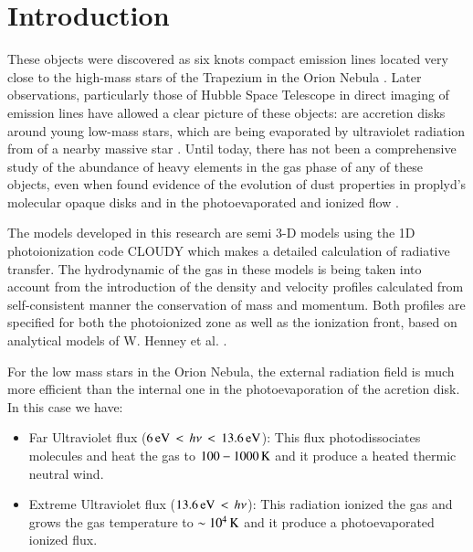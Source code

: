 \documentclass[aaspp]{article}
\begin{document}


\section{Introduction}
\label{sec:introduction}

These objects were discovered as six knots compact emission lines located very close to the high-mass stars of the Trapezium in the Orion Nebula \citep{1979AA.7397L}. Later observations, particularly those of Hubble Space Telescope in direct imaging of emission lines \citep{1993ApJ410..696O, 1998AJ.115..263O, 1998AJ.116..293B} have allowed a clear picture of these objects: are accretion disks around young low-mass stars, which are being evaporated by ultraviolet radiation from of a nearby massive star \citep{1998ApJ499..758J, 1998AJ.116..322H, 1999ApJ515..669S}. Until today, there has not been a comprehensive study of the abundance of heavy elements in the gas phase of any of these objects, even when found evidence of the evolution of dust properties in proplyd's molecular opaque disks \citep{2003ApJ587L.109S} and in the photoevaporated and ionized flow \citep{2001ApJ561..830G}.

The models developed in this research are semi 3-D models using the 1D photoionization code {\sc CLOUDY} \citep{1998PASP..110..761F} which makes a detailed calculation of radiative transfer. The hydrodynamic of the gas in these models is being taken into account from the introduction of the density and velocity profiles calculated from self-consistent manner the conservation of mass and momentum. Both profiles are specified for both the photoionized zone as well as the ionization front, based on analytical models of W. Henney et al. \citep{1999AJ.118.2350H,2005ApJ621..328H}.

For the low mass stars in the Orion Nebula, the external radiation field \tc is much more efficient than the internal one in the photoevaporation of the acretion disk. In this case we have:

\begin{itemize}
\item{Far Ultraviolet flux ($6 \, {\rm eV} \, < \, h \nu \, < \, 13.6 \, {\rm eV}$): This flux photodissociates molecules and heat the gas to $100 - 1000 \, {\rm K}$ and it produce a heated thermic neutral wind.} 
\item{Extreme Ultraviolet flux ($13.6 \, {\rm eV} \, < \, h \nu$): This radiation ionized the gas and grows the gas temperature to $\sim 10^4 \, {\rm K}$ and it produce a photoevaporated ionized flux.}
\end{itemize}
\end{document}
